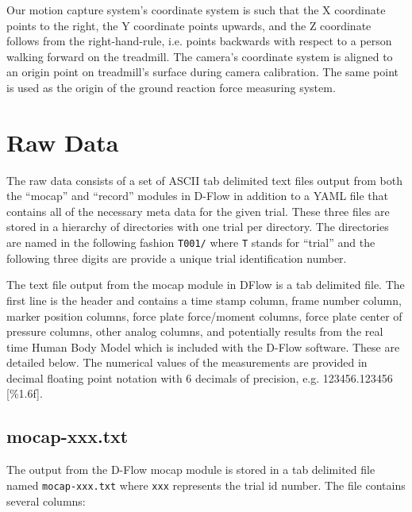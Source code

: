 \documentclass[10pt,a4paper,twocolumn]{article}
\begin{document}
Our motion capture system's coordinate system is such that the X coordinate
points to the right, the Y coordinate points upwards, and the Z coordinate
follows from the right-hand-rule, i.e. points backwards with respect to a
person walking forward on the treadmill. The camera's coordinate system is
aligned to an origin point on treadmill's surface during camera calibration.
The same point is used as the origin of the ground reaction force measuring
system.

\section*{Raw Data}
%
The raw data consists of a set of ASCII tab delimited text files output from
both the ``mocap'' and ``record'' modules in D-Flow in addition to a YAML file
that contains all of the necessary meta data for the given trial. These three
files are stored in a hierarchy of directories with one trial per directory.
The directories are named in the following fashion \verb+T001/+ where \verb+T+
stands for ``trial'' and the following three digits are provide a unique trial
identification number.

The text file output from the mocap module in DFlow is a tab delimited file.
The first line is the header and contains a time stamp column, frame number
column, marker position columns, force plate force/moment columns, force plate
center of pressure columns, other analog columns, and potentially results from
the real time Human Body Model \cite{Bogert2013} which is included with the
D-Flow software. These are detailed below. The numerical values of the
measurements are provided in decimal floating point notation with 6 decimals of
precision, e.g. 123456.123456 [\%1.6f].

\subsection*{mocap-xxx.txt}

The output from the D-Flow mocap module is stored in a tab delimited file named
\verb+mocap-xxx.txt+ where \verb+xxx+ represents the trial id number. The file
contains several columns:
\end{document}
